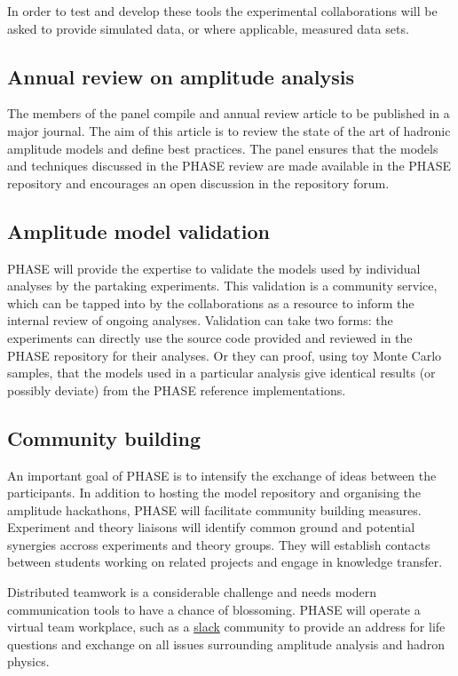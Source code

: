 In order to test and develop these tools the experimental collaborations will be asked to provide simulated data, or where applicable, measured data sets. 


\subsection{Annual review on amplitude analysis}
\label{rec:review}
The members of the panel compile and annual review article to be published in a major journal. The aim of this article is to review the state of the art of hadronic amplitude models and define best practices. The panel ensures that the models and techniques discussed in the PHASE review are made available in the PHASE repository and encourages an open discussion in the repository forum.

\subsection{Amplitude model validation}
\label{sec:validation}
PHASE will provide the expertise to validate the models used by individual analyses by the partaking experiments. This validation is a community service, which can be tapped into by the collaborations as a resource to inform the internal review of ongoing analyses. Validation can take two forms: the experiments can directly use the source code provided and reviewed in the PHASE repository for their analyses. Or they can proof, using toy Monte Carlo samples, that the models used in a particular analysis give identical results (or possibly deviate) from the PHASE reference implementations.

\subsection{Community building}
\label{sec:community}
An important goal of PHASE is to intensify the exchange of ideas between the participants. In addition to hosting the model repository and organising the amplitude hackathons, PHASE will facilitate community building measures. Experiment and theory liaisons will identify common ground and potential synergies accross experiments and theory groups. They will establish contacts between students working on related projects and engage in knowledge transfer.

Distributed teamwork is a considerable challenge and needs modern communication tools to have a chance of blossoming. PHASE will operate a virtual team workplace, such as a \href{http://slack.com}{slack} community to provide an address for life questions and exchange on all issues surrounding amplitude analysis and hadron physics.    

